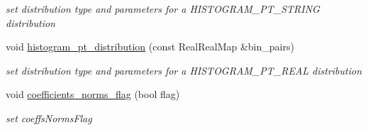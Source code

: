 \begin{DoxyCompactItemize}
\begin{DoxyCompactList}\small\item\em set distribution type and parameters for a H\+I\+S\+T\+O\+G\+R\+A\+M\+\_\+\+P\+T\+\_\+\+S\+T\+R\+I\+NG distribution \end{DoxyCompactList}\item 
void \hyperlink{classPecos_1_1NumericGenOrthogPolynomial_a7594170792e5fc5c27b94e61fa753d88}{histogram\+\_\+pt\+\_\+distribution} (const Real\+Real\+Map \&bin\+\_\+pairs)\label{classPecos_1_1NumericGenOrthogPolynomial_a7594170792e5fc5c27b94e61fa753d88}

\begin{DoxyCompactList}\small\item\em set distribution type and parameters for a H\+I\+S\+T\+O\+G\+R\+A\+M\+\_\+\+P\+T\+\_\+\+R\+E\+AL distribution \end{DoxyCompactList}\item 
void \hyperlink{classPecos_1_1NumericGenOrthogPolynomial_a738108531d8a83dd1a9c6021c76e6bee}{coefficients\+\_\+norms\+\_\+flag} (bool flag)\label{classPecos_1_1NumericGenOrthogPolynomial_a738108531d8a83dd1a9c6021c76e6bee}

\begin{DoxyCompactList}\small\item\em set coeffs\+Norms\+Flag \end{DoxyCompactList}\end{DoxyCompactItemize}
